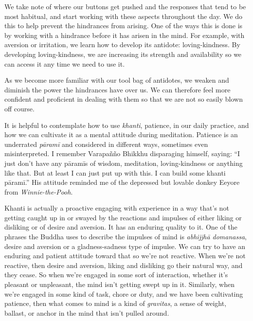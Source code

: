 We take note of where our buttons get pushed and the responses that 
tend to be most habitual, and start working with these aspects 
throughout the day. We do this to help prevent the hindrances from 
arising. One of the ways this is done is by working with a hindrance 
before it has arisen in the mind. For example, with aversion or 
irritation, we learn how to develop its antidote: loving-kindness. By 
developing loving-kindness, we are increasing its strength and 
availability so we can access it any time we need to use it.

As we become more familiar with our tool bag of antidotes, we weaken 
and diminish the power the hindrances have over us. We can therefore 
feel more confident and proficient in dealing with them so that we are 
not so easily blown off course.


It is helpful to contemplate how to use \emph{khanti}, patience, in our 
daily practice, and how we can cultivate it as a mental attitude during 
meditation. Patience is an underrated \emph{pāramī} and considered in 
different ways, sometimes even misinterpreted. I remember Varapañño 
Bhikkhu disparaging himself, saying: ``I just don't have any pāramīs 
of wisdom, meditation, loving-kindness or anything like that. But at 
least I can just put up with this. I can build some khanti pāramī.'' 
His attitude reminded me of the depressed but lovable donkey Eeyore 
from \emph{Winnie-the-Pooh}.

Khanti is actually a proactive engaging with experience in a way that's 
not getting caught up in or swayed by the reactions and impulses of 
either liking or disliking or of desire and aversion. It has an 
enduring quality to it. One of the phrases the Buddha uses to describe 
the impulses of mind is \emph{abhijjhā domanassa}, desire and aversion 
or a gladness-sadness type of impulse. We can try to have an enduring 
and patient attitude toward that so we're not reactive. When we're not 
reactive, then desire and aversion, liking and disliking go their 
natural way, and they cease. So when we're engaged in some sort of 
interaction, whether it's pleasant or unpleasant, the mind isn't 
getting swept up in it. Similarly, when we're engaged in some kind of 
task, chore or duty, and we have been cultivating patience, then what 
comes to mind is a kind of \emph{gravitas}, a sense of weight, ballast, 
or anchor in the mind that isn't pulled around.

